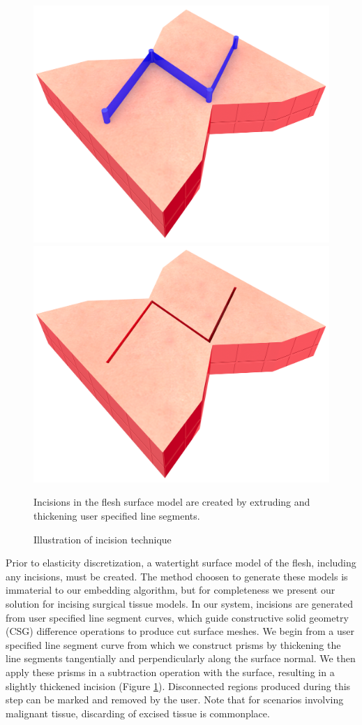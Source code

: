 \begin{figure}
\vspace*{-.23in}
  \centering
  \includegraphics[width=.45\columnwidth]{chapter_gridiron/images/Uncut_Surface_Model2.png}
  \includegraphics[width=.45\columnwidth]{chapter_gridiron/images/Cut_Surface_Model2.png}
\vspace*{-.12in}
  \caption{Illustration of incision technique}{Incisions in the flesh surface model are created by extruding and thickening user specified line segments.}
\label{fig:incision}
\end{figure}

Prior to elasticity discretization, a watertight surface model of the
flesh, including any incisions, must be created. The method choosen to
generate these models is immaterial to our embedding algorithm, but
for completeness we present our solution for incising surgical tissue
models. In our system, incisions are generated from user specified
line segment curves, which guide constructive solid geometry (CSG)
difference operations to produce cut surface meshes.  We begin from a
user specified line segment curve from which we construct prisms by
thickening the line segments tangentially and perpendicularly along
the surface normal. We then apply these prisms in a subtraction
operation with the surface, resulting in a slightly thickened incision
(Figure \ref{fig:incision}). Disconnected regions produced during this
step can be marked and removed by the user. Note that for scenarios
involving malignant tissue, discarding of excised tissue is
commonplace.

